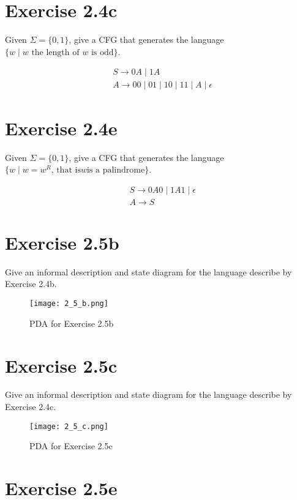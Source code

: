 \documentclass{article}
\newcommand{\where}{\mid}
\begin{document}
\section{Exercise 2.4c}

Given $\Sigma = \{0, 1\}$, give a CFG that generates the language $\{ w \where
w \text{ the length of } w \text{ is odd} \}$.

\begin{align*}
	&S \rightarrow 0A \mid 1A\\
	&A \rightarrow 00 \mid 01 \mid 10 \mid 11 \mid A \mid \epsilon
\end{align*}

\section{Exercise 2.4e}

Given $\Sigma = \{0, 1\}$, give a CFG that generates the language $\{ w \where
w = w^R \text{, that is} w \text{is a palindrome} \}$.

\begin{align*}
	&S \rightarrow 0A0 \mid 1A1 \mid \epsilon\\
	&A \rightarrow S
\end{align*}

\section{Exercise 2.5b}

Give an informal description and state diagram for the language describe by
Exercise 2.4b.

\begin{figure}[h!]
	\centering
	\texttt{[image: 2\_5\_b.png]}
	\caption{PDA for Exercise 2.5b}
\end{figure}

\section{Exercise 2.5c}

Give an informal description and state diagram for the language describe by
Exercise 2.4c.

\begin{figure}[h!]
	\centering
	\texttt{[image: 2\_5\_c.png]}
	\caption{PDA for Exercise 2.5c}
\end{figure}

\section{Exercise 2.5e}
\end{document}
